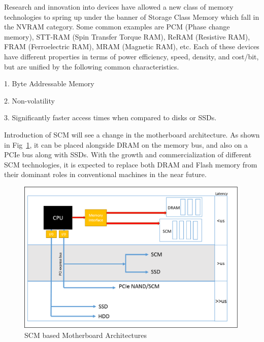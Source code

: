 Research and innovation into devices have allowed a new class of memory technologies to spring up under the banner of Storage Class Memory which fall in the NVRAM category. Some common examples are PCM (Phase change memory), STT-RAM (Spin Transfer Torque RAM), ReRAM (Resistive RAM), FRAM (Ferroelectric RAM), MRAM (Magnetic RAM), etc. Each of these devices have different properties in terms of power efficiency, speed, density, and cost/bit, but are unified by the following common characteristics.

1. Byte Addressable Memory

2. Non-volatility

3. Significantly faster access times when compared to disks or SSDs.

Introduction of SCM will see a change in the motherboard architecture. As shown in Fig~\ref{fig:new_arch}, it can be placed alongside DRAM on the memory bus, and also on a PCIe bus along with SSDs. With the growth and commercialization of different SCM technologies, it is expected to replace both DRAM and Flash memory from their dominant roles in conventional machines in the near future. 

\setlength{\belowcaptionskip}{-10pt}

\begin{figure}[H]
  \centering
  \includegraphics[scale=0.6]{figures/new_mem_arch.png}
  \caption{SCM based Motherboard Architectures}
  \label{fig:new_arch}
\end{figure}

